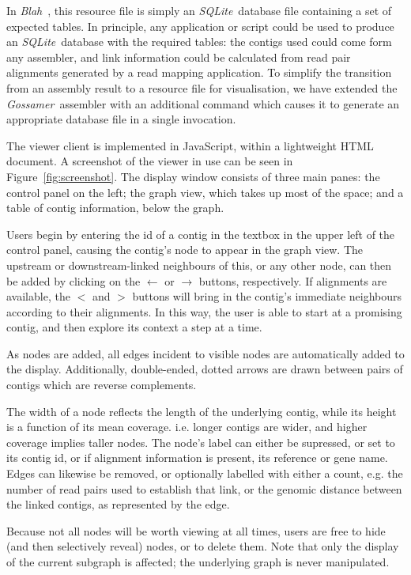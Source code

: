 \documentclass{article}
\def\Blah{\textit{Blah}\ }
\def\Gossamer{\textit{Gossamer}\ }
\def\SQLite{\textit{SQLite}\ }
\begin{document}
In \Blah, this resource file is simply an \SQLite database file containing a set of expected tables. 
In principle, any application or script could be used to produce an \SQLite database with the required tables: 
the contigs used could come form any assembler, and link information could be calculated from read pair alignments generated by a read mapping application.
To simplify the transition from an assembly result to a resource file for visualisation, we have extended the \Gossamer assembler with 
an additional command which causes it to generate an appropriate database file in a single invocation.

The viewer client is implemented in JavaScript, within a lightweight HTML document.
A screenshot of the viewer in use can be seen in Figure~\ref{fig:screenshot}.
The display window consists of three main panes: the control panel on the left; the graph view, which takes up most of the space; and a table of contig 
information, below the graph. 

Users begin by entering the id of a contig in the textbox in the upper left of the control panel, causing the contig's node to appear in the graph view. 
The upstream or downstream-linked neighbours of this, or any other node, can then be added by clicking on the $\leftarrow$ or $\rightarrow$ buttons, respectively.
If alignments are available, the $<$ and $>$ buttons will bring in the contig's immediate neighbours according to their alignments. 
In this way, the user is able to start at a promising contig, and then explore its context a step at a time.

As nodes are added, all edges incident to visible nodes are automatically added to the display. 
Additionally, double-ended, dotted arrows are drawn between pairs of contigs which are reverse complements.

The width of a node reflects the length of the underlying contig, while its height is a function of its mean coverage. 
i.e. longer contigs are wider, and higher coverage implies taller nodes.
The node's label can either be supressed, or set to its contig id, or if alignment information is present, its reference or gene name.
Edges can likewise be removed, or optionally labelled with either a count, e.g. the number of read pairs used to establish that link, 
or the genomic distance between the linked contigs, as represented by the edge.

Because not all nodes will be worth viewing at all times, users are free to hide (and then selectively reveal) nodes, or to delete them.
Note that only the display of the current subgraph is affected; the underlying graph is never manipulated.
\end{document}
